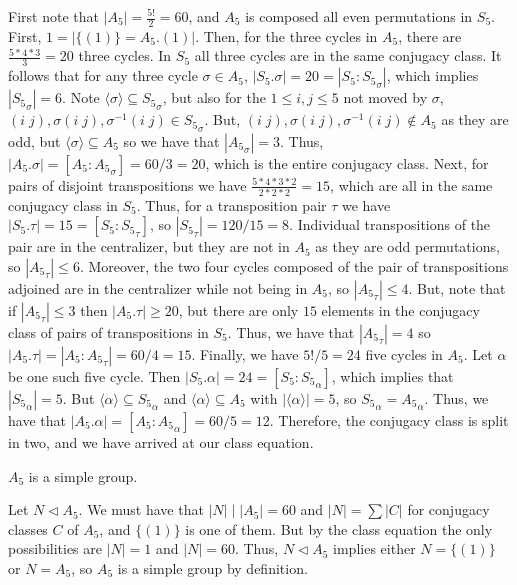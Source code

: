 \documentclass[12pt, a4paper, twoside, openright, titlepage]{book}
\begin{document}
\begin{eg}{}{}
\begin{enumerate}
                        First note that $|A_5| = \frac{5!}{2} = 60$, and $A_5$ is composed all even permutations in $S_5$. First, $1 = |\{(1)\} = A_5.(1)|$. Then, for the three cycles in $A_5$, there are $\frac{5*4*3}{3} = 20$ three cycles. In $S_5$ all three cycles are in the same conjugacy class. It follows that for any three cycle $\sigma \in A_5$, $|S_5.\sigma| = 20 = |S_5:{S_5}_{\sigma}|$, which implies $|{S_5}_{\sigma}| = 6$. Note $\langle \sigma \rangle \subseteq {S_5}_{\sigma}$, but also for the $1 \leq i,j \leq 5$ not moved by $\sigma$, $(i\;j), \sigma(i\;j), \sigma^{-1}(i\;j) \in {S_5}_{\sigma}$. But, $(i\;j), \sigma(i\;j), \sigma^{-1}(i\;j) \notin A_5$ as they are odd, but $\langle \sigma \rangle \subseteq A_5$ so we have that $|{A_5}_{\sigma}| = 3$. Thus, $|A_5.\sigma| = [A_5:{A_5}_{\sigma}] = 60/3 = 20$, which is the entire conjugacy class. Next, for pairs of disjoint transpositions we have $\frac{5*4*3*2}{2*2*2} = 15$, which are all in the same conjugacy class in $S_5$. Thus, for a transposition pair $\tau$ we have $|S_5.\tau| = 15 = [S_5:{S_5}_{\tau}]$, so $|{S_5}_{\tau}| = 120/15 = 8$. Individual transpositions of the pair are in the centralizer, but they are not in $A_5$ as they are odd permutations, so $|{A_5}_{\tau}| \leq 6$. Moreover, the two four cycles composed of the pair of transpositions adjoined are in the centralizer while not being in $A_5$, so $|{A_5}_{\tau}| \leq 4$. But, note that if $|{A_5}_{\tau}| \leq 3$ then $|A_5.\tau| \geq 20$, but there are only $15$ elements in the conjugacy class of pairs of transpositions in $S_5$. Thus, we have that $|{A_5}_{\tau}| = 4$ so $|A_5.\tau| = |A_5:{A_5}_{\tau}| = 60/4 = 15$. Finally, we have $5!/5 =24$ five cycles in $A_5$. Let $\alpha$ be one such five cycle. Then $|S_5.\alpha| = 24 = [S_5:{S_5}_{\alpha}]$, which implies that $|{S_5}_{\alpha}| = 5$. But $\langle \alpha \rangle \subseteq {S_5}_{\alpha}$ and $\langle \alpha \rangle \subseteq A_5$ with $|\langle \alpha\rangle| = 5$, so ${S_5}_{\alpha} = {A_5}_{\alpha}$. Thus, we have that $|A_5.\alpha| = [A_5:{A_5}_{\alpha}] = 60/5 = 12$. Therefore, the conjugacy class is split in two, and we have arrived at our class equation.
        \end{enumerate}
\end{eg}

\begin{cor}{}{} 
        $A_5$ is a simple group.
\end{cor}
\begin{proof*}{}{}
        Let $N \vartriangleleft A_5$. We must have that $|N|\;\vert\;|A_5| = 60$ and $|N| = \sum|C|$ for conjugacy classes $C$ of $A_5$, and $\{(1)\}$ is one of them. But by the class equation the only possibilities are $|N| = 1$ and $|N| = 60$. Thus, $N \vartriangleleft A_5$ implies either $N = \{(1)\}$ or $N = A_5$, so $A_5$ is a simple group by definition.
\end{proof*}
\end{document}
